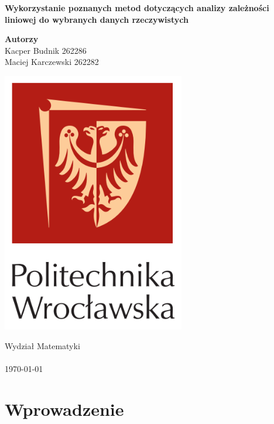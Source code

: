 \documentclass[12pt,leqno]{article}
\theoremstyle{exer}
\begin{document}
	\begin{titlepage}
		\begin{center}
			
			\textbf{\Huge  Wykorzystanie poznanych metod dotyczących analizy zależności liniowej
				do wybranych danych rzeczywistych}
			
			\vspace{0.5cm}
			
			\vspace{1.5cm}
			
			\textbf{\LARGE Autorzy}\\
			\vspace{0.5cm}
			\large Kacper Budnik 262286\\
			\large Maciej Karczewski 262282\\
			
			
			\vfill
			
			\vspace{0.4cm}
			
			\includegraphics[width=0.60\textwidth]{images/logo.PNG}
			
			\vspace{0.8cm}
			Wydział Matematyki\\\\
			\today
		\end{center}
	\end{titlepage}
	\tableofcontents
	\newpage
	
	\section{Wprowadzenie}
	
\end{document}
